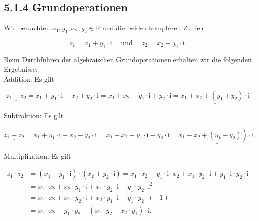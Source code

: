 \documentclass[10pt]{article}
\begin{document}
\subsection*{5.1.4 Grundoperationen}
Wir betrachten $x_{1}, y_{1}, x_{2}, y_{2} \in \mathbb{R}$ und die beiden komplexen Zahlen


\begin{equation*}
z_{1}=x_{1}+y_{1} \cdot \mathrm{i} \quad \text { und } \quad z_{2}=x_{2}+y_{2} \cdot \mathrm{i} . \tag{5.7}
\end{equation*}


Beim Durchführen der algebraischen Grundoperationen erhalten wir die folgenden Ergebnisse:\\
Addition: Es gilt


\begin{equation*}
\underline{\underline{z_{1}+z_{2}}}=x_{1}+y_{1} \cdot \mathrm{i}+x_{2}+y_{2} \cdot \mathrm{i}=x_{1}+x_{2}+y_{1} \cdot \mathrm{i}+y_{2} \cdot \mathrm{i}=\underline{\underline{x_{1}+x_{2}+\left(y_{1}+y_{2}\right) \cdot \mathrm{i}}} \tag{5.8}
\end{equation*}


Subtraktion: Es gilt


\begin{equation*}
\underline{\underline{z_{1}-z_{2}}}=x_{1}+y_{1} \cdot \mathrm{i}-x_{2}-y_{2} \cdot \mathrm{i}=x_{1}-x_{2}+y_{1} \cdot \mathrm{i}-y_{2} \cdot \mathrm{i}=\underline{\left.\underline{x_{1}-x_{2}+\left(y_{1}-y_{2}\right)}\right) \cdot \mathrm{i} .} \tag{5.9}
\end{equation*}


Multiplikation: Es gilt


\begin{align*}
\underline{z_{1} \cdot z_{2}} & =\left(x_{1}+y_{1} \cdot \mathrm{i}\right) \cdot\left(x_{2}+y_{2} \cdot \mathrm{i}\right)=x_{1} \cdot x_{2}+y_{1} \cdot \mathrm{i} \cdot x_{2}+x_{1} \cdot y_{2} \cdot \mathrm{i}+y_{1} \cdot \mathrm{i} \cdot y_{2} \cdot \mathrm{i} \\
& =x_{1} \cdot x_{2}+x_{2} \cdot y_{1} \cdot \mathrm{i}+x_{1} \cdot y_{2} \cdot \mathrm{i}+y_{1} \cdot y_{2} \cdot \mathrm{i}^{2} \\
& =x_{1} \cdot x_{2}+x_{1} \cdot y_{2} \cdot \mathrm{i}+x_{2} \cdot y_{1} \cdot \mathrm{i}+y_{1} \cdot y_{2} \cdot(-1) \\
& =\underline{x_{1} \cdot x_{2}-y_{1} \cdot y_{2}+\left(x_{1} \cdot y_{2}+x_{2} \cdot y_{1}\right) \cdot \mathrm{i} .} \tag{5.10}
\end{align*}
\end{document}
